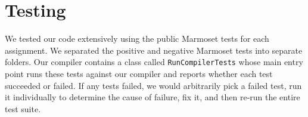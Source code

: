 \documentclass[12pt]{article}
\newcommand{\code}[1]{\texttt{#1}}
\begin{document}
\section{Testing}

We tested our code extensively using the public Marmoset tests for each assignment. We separated the positive and negative Marmoset tests into separate folders. Our compiler contains a class called \code{RunCompilerTests} whose main entry point runs these tests against our compiler and reports whether each test succeeded or failed. If any tests failed, we would arbitrarily pick a failed test, run it individually to determine the cause of failure, fix it, and then re-run the entire test suite.
\end{document}
